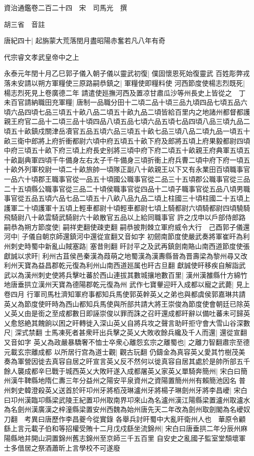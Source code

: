 資治通鑑卷二百二十四　宋　司馬光　撰

胡三省　音註

唐紀四十|{
	起旃蒙大荒落閏月盡昭陽赤奮若凡八年有奇}


代宗睿文孝武皇帝中之上

永泰元年閏十月乙巳郭子儀入朝子儀以靈武初復|{
	僕固懷恩死始復靈武}
百姓彫弊戎落未安請以朔方軍糧使三原路嗣恭鎮之|{
	軍糧使即糧料使}
河西節度使楊志烈既死|{
	楊志烈死見上卷廣德二年}
請遣使廵撫河西及置凉甘肅瓜沙等州長史上皆從之　丁未百官請納職田充軍糧|{
	唐制一品職分田十二頃二品十頃三品九頃四品七頃五品六頃六品四頃七品三頃五十畝八品二頃五十畝九品二頃皆給百里内之地諸州都督都護親王府官二品十二頃三品十頃四品八頃五品七頃六品五頃七品四頃八品三頃九品二頃五十畝鎮戍關津岳凟官五品五頃六品三頃五十畝七品三頃八品二頃九品一頃五十畝三衛中郎將上府折衝都尉六頃中府五頃五十畝下府及郎將五頃上府果毅都尉四頃中府三頃五十畝下府三頃上府長史别將三頃中府下府二頃五十畝親王府典軍五頃五十畝副典軍四頃千牛備身左右太子千牛備身三頃折衝上府兵曹二頃中府下府一頃五十畝外列軍校尉一頃二十畝旅帥一頃隊正副八十畝親王以下又有永業田百頃職事官一品六十頃郡王職事官從一品五十頃國公職事官從二品三十五頃郡公職事官從三品二十五頃縣公職事官從三品二十頃侯職事官從四品十二頃子職事官從五品八頃男職事官從五品五頃六品七品二頃五十八畝八品九品二頃上柱國三十頃柱國二十五頃上護軍二十頃護軍十五頃上輕車都尉十頃輕車都尉七頃上騎都尉六頃騎都尉四頃驍騎飛騎尉八十畝雲騎武騎尉六十畝散官五品以上給同職事官}
許之戊申以戶部侍郎路嗣恭為朔方節度使|{
	嗣祥吏翻使疎吏翻}
嗣恭披荆棘立軍府威令大行　己酉郭子儀還河中|{
	子儀自朝京師還鎮河中還從宣翻又音如字}
初劒南節度使嚴武奏將軍崔旰為利州刺史時蜀中新亂山賊塞路|{
	塞昔則翻}
旰討平之及武再鎮劍南賂山南西道節度使張獻誠以求旰|{
	利州古苴侯邑秦漢為葭萌之地蜀漢為漢夀縣晉為晋壽梁為黎州尋又改利州天寶為益昌郡乾元復為利州山南西道廵属也旰古旦翻}
獻誠使旰移疾自解詣武武以為漢州刺史使將兵擊吐蕃於西山連拔其數城攘地數百里|{
	漢州漢雒縣什方綿竹地唐垂拱立漢州天寶為德陽郡乾元復為州}
武作七寶轝迎旰入成都以寵之武薨|{
	見上卷四月}
行軍司馬杜濟知軍府事都知兵馬使郭英幹英乂之弟也與都虞侯郭嘉琳共請英乂為節度使旰時為西山都知兵馬使與所部共請大將王崇俊為節度使會朝廷已除英乂英乂由是銜之至成都數日即誣崇俊以罪而誅之召旰還成都旰辭以備吐蕃未可歸英乂愈怒絶其餽餉以困之旰轉徙入深山英乂自將兵攻之聲言助旰拒守會大雪山谷深數尺|{
	深式禁翻}
士馬凍死者甚衆旰出兵擊之英乂大敗收餘兵纔及千人而還|{
	還從宣翻又音如字}
英乂為政嚴暴驕奢不恤士卒衆心離怨玄宗之離蜀也|{
	之離力智翻肅宗至德元載玄宗離成都}
以所居行宫為道士觀|{
	觀古玩翻}
仍鑄金為真容英乂愛其竹樹茂美奏為軍營因徙去真容自居之旰宣言英乂反不然何以徙真容自居其處於是帥所部五千餘人襲成都辛巳戰于城西英乂大敗旰遂入成都屠英乂家英乂單騎奔簡州|{
	宋白曰簡州漢牛鞞縣地隋仁夀三年分益州之陽安平泉資州之資陽置簡州州有賴簡池因名}
普州刺史韓澄殺英乂送首於旰卭州牙將栢茂琳瀘州牙將楊子琳劍州牙將李昌巙|{
	宋白曰卭州漢臨卭縣梁武陵王紀置卭州取南界卭來山為名瀘州漢江陽縣梁置瀘州取瀘水為名劍州漢廣漢之梓潼縣梁置安州西魏為始州唐先天二年改為劍州取劍閣為名巙奴刀翻　考異曰唐歷作李昌夔今從實錄}
各舉兵討旰蜀中大亂旰衛州人也　華原令顧繇上言元載子伯和等招權受賄十二月戊戍繇坐流錦州|{
	宋白曰唐垂拱二年分辰州麻陽縣地并開山洞置錦州舊志錦州至京師三千五百里}
自安史之亂國子監室堂頹壞軍士多借居之祭酒蕭昕上言學校不可遂廢

